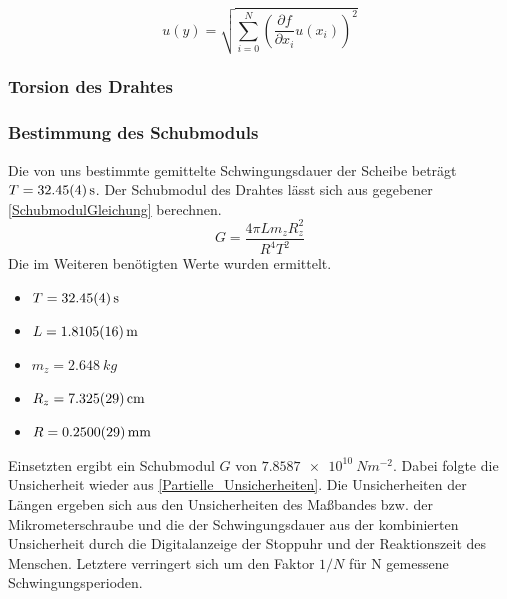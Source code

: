 \documentclass[
	a4paper,
	12pt,
	pagesize,
	ngerman
]{scrartcl}
\begin{document}
	\begin{equation}
	u(y) = \sqrt{  \sum_{i=0}^{N} \left( \frac{\partial f}{\partial x_i}u(x_i)\right)^2  }
	\label{Partielle_Unsicherheiten}
	\end{equation}
	
	\subsubsection{Torsion des Drahtes}
	\subsubsection*{Bestimmung des Schubmoduls}
	Die von uns bestimmte gemittelte Schwingungsdauer der Scheibe beträgt $T=\SI{32,45 \pm 0,04}{s}$.
	Der Schubmodul des Drahtes lässt sich aus gegebener \cref{SchubmodulGleichung} berechnen.
	\begin{equation}
		\label{SchubmodulGleichung}
		G = \frac{4\pi Lm_zR_z^2}{R^4T^2}
	\end{equation}
	Die im Weiteren benötigten Werte wurden ermittelt. 
	\begin{itemize}
		\item $T=\SI{32,45 \pm 0,04}{s}$
		\item $L = \SI{1,8105 \pm 0,0016 }{m}$
		\item $m_z = \SI{2,648}{kg}$
		\item $R_z = \SI{7,325 \pm 0,029}{cm}$
		\item $R = \SI{0,25 \pm 0,0029}{mm}$
	\end{itemize}
	Einsetzten ergibt ein Schubmodul $G$ von $\SI{7,8587e10}{Nm^{-2}}$. Dabei folgte die Unsicherheit wieder aus \cref{Partielle_Unsicherheiten}.
	Die Unsicherheiten der Längen ergeben sich aus den Unsicherheiten des Maßbandes bzw. der Mikrometerschraube und die der Schwingungsdauer aus der kombinierten Unsicherheit durch die Digitalanzeige der Stoppuhr und der Reaktionszeit des Menschen. Letztere verringert sich um den Faktor $1/N $ für N gemessene Schwingungsperioden.
\end{document}
